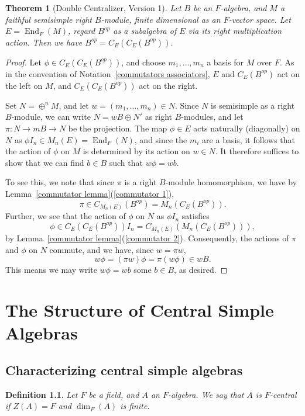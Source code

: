 \documentclass[12pt]{report}
\theoremstyle{plain}
\newtheorem{thm}{Theorem}[section]
\newtheorem{defn}[thm]{Definition}
\newcommand{\oper}[1]{\operatorname{#1}}
\newcommand{\End}{\oper{End}}
\begin{document}
\begin{thm}[Double Centralizer, Version 1] \label{dc1} 
Let $B$ be an $F$-algebra, and $M$ a faithful semisimple right $B$-module,
finite dimensional as an $F$-vector space. Let $E = \End_F(M)$, regard
$B^{op}$ as a subalgebra of $E$ via its right multiplication action. Then
we have $B^{op} = C_E(C_E(B^{op}))$.
\end{thm}
\begin{proof}
Let $\phi \in C_E(C_E(B^{op}))$, and choose $m_1, \ldots, m_n$ a basis for $M$ over
$F$. As in the convention of Notation~\ref{commutators associators}, $E$
and $C_E(B^{op})$
act on the left on $M$, and $C_E(C_E(B^{op}))$ act on the right. 

Set $N = \oplus^n M$, and let $w = (m_1, \ldots, m_n) \in N$. Since $N$ is
semisimple as a right $B$-module, we can write $N = wB \oplus N'$ as right
$B$-modules, and let $\pi : N \to mB \to N$ be the projection. The map $\phi \in
E$ acts naturally (diagonally) on $N$ as $\phi I_n \in M_n(E) = \End_F(N)$,
and since the $m_i$ are a basis, it follows that the action of $\phi$ on
$M$ is determined by its action on $w \in N$. It therefore suffices to show
that we can find $b \in B$ such that $w \phi = w b$.

To see this, we note that since $\pi$ is a right $B$-module homomorphism,
we have by Lemma~\ref{commutator lemma}(\ref{commutator 1}),
\[\pi \in C_{M_n(E)}(B^{op}) = M_n(C_E(B^{op})).\]
Further, we see that the action of $\phi$ on $N$ as $\phi I_n$ satisfies
\[\phi \in C_E(C_E(B^{op})) I_n = C_{M_n(E)}(M_n(C_E(B^{op}))),\]
by Lemma~\ref{commutator lemma}(\ref{commutator 2}). Consequently, the actions of $\pi$ and
$\phi$ on $N$ commute, and we have, since $w = \pi w$,
\[ w \phi = (\pi w) \phi = \pi(w \phi) \in wB.\]
This means we may write $w\phi = wb$ some $b \in B$, as desired.
\end{proof}

\chapter{The Structure of Central Simple Algebras}

\section{Characterizing central simple algebras}

\begin{defn}
Let $F$ be a field, and $A$ an $F$-algebra. We say that $A$ is $F$-central
if $Z(A) = F$ and $\dim_F(A)$ is finite.
\end{defn}
\end{document}
